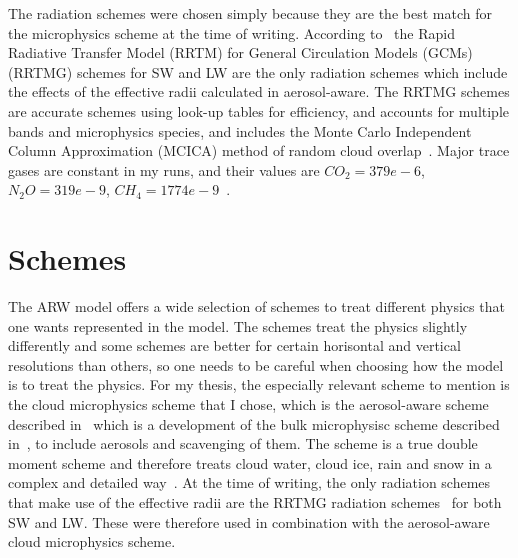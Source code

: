 The radiation schemes were chosen simply because they are the best match for the microphysics scheme at the time of writing. According to~\citet{Thompson2014} the Rapid Radiative Transfer Model (RRTM) for General Circulation Models (GCMs) (RRTMG) schemes for SW and LW are the only radiation schemes which include the effects of the effective radii calculated in aerosol-aware. The RRTMG schemes are accurate schemes using look-up tables for efficiency, and accounts for multiple bands and microphysics species, and includes the Monte Carlo Independent Column Approximation (MCICA) method of random cloud overlap~\citep{Wang2015}. Major trace gases are constant in my runs, and their values are $CO_2=379e-6$, $N_2O=319e-9$, $CH_4=1774e-9$~\citep{Wang2015}.

\section{Schemes}
\label{sec:schemes}
The ARW model offers a wide selection of schemes to treat different physics that one wants represented in the model. The schemes treat the physics slightly differently and some schemes are better for certain horisontal and vertical resolutions than others, so one needs to be careful when choosing how the model is to treat the physics. For my thesis, the especially relevant scheme to mention is the cloud microphysics scheme that I chose, which is the aerosol-aware scheme described in~\citet{Thompson2014} which is a development of the bulk microphysisc scheme described in~\citet{Thompson2008}, to include aerosols and scavenging of them. The scheme is a true double moment scheme and therefore treats cloud water, cloud ice, rain and snow in a complex and detailed way~\citep{Thompson2014}. At the time of writing, the only radiation schemes that make use of the effective radii are the RRTMG radiation schemes~\citep{Mlawer1997, Iacono2000, Iacono2003, Iacono2008} for both SW and LW. These were therefore used in combination with the aerosol-aware cloud microphysics scheme.

